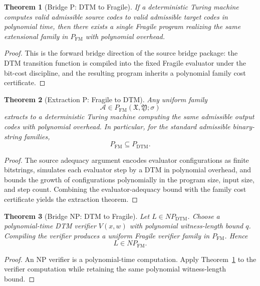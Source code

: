 \documentclass[11pt]{article}
\newtheorem{theorem}{Theorem}[section]
\theoremstyle{definition}
\theoremstyle{remark}
\newcommand{\FM}{\mathrm{FM}}
\newcommand{\DTM}{\mathrm{DTM}}
\newcommand{\NPFM}{NP_{\mathrm{FM}}}
\newcommand{\NPDTM}{NP_{\mathrm{DTM}}}
\begin{document}
\begin{theorem}[Bridge P: DTM to Fragile]\label{thm-bridge-p-dtm-to-fragile}
If a deterministic Turing machine computes valid admissible source codes to valid admissible target codes in polynomial time, then there exists a single Fragile program realizing the same extensional family in $P_{\FM}$ with polynomial overhead.
\end{theorem}

\begin{proof}
This is the forward bridge direction of the source bridge package: the DTM transition function is compiled into the fixed Fragile evaluator under the bit-cost discipline, and the resulting program inherits a polynomial family cost certificate.
\end{proof}

\begin{theorem}[Extraction P: Fragile to DTM]\label{thm-extraction-p-fragile-to-dtm}
Any uniform family
\[
\mathcal A \in P_{\FM}(\mathfrak X, \mathfrak Y; \sigma)
\]
extracts to a deterministic Turing machine computing the same admissible output codes with polynomial overhead. In particular, for the standard admissible binary-string families,
\[
P_{\FM} \subseteq P_{\DTM}.
\]
\end{theorem}

\begin{proof}
The source adequacy argument encodes evaluator configurations as finite bitstrings, simulates each evaluator step by a DTM in polynomial overhead, and bounds the growth of configurations polynomially in the program size, input size, and step count. Combining the evaluator-adequacy bound with the family cost certificate yields the extraction theorem.
\end{proof}

\begin{theorem}[Bridge NP: DTM to Fragile]\label{thm-bridge-np-dtm-to-fragile}
Let $L \in \NPDTM$. Choose a polynomial-time DTM verifier $V(x,w)$ with polynomial witness-length bound $q$. Compiling the verifier produces a uniform Fragile verifier family in $P_{\FM}$. Hence
\[
L \in \NPFM.
\]
\end{theorem}

\begin{proof}
An NP verifier is a polynomial-time computation. Apply Theorem~\ref{thm-bridge-p-dtm-to-fragile} to the verifier computation while retaining the same polynomial witness-length bound.
\end{proof}
\end{document}
